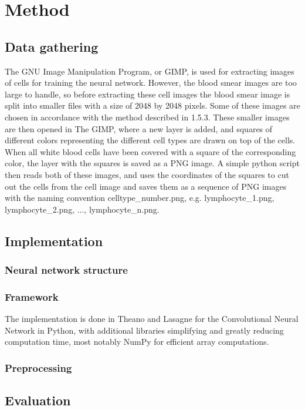 \chapter{Method}\label{cha:intro}

\section{Data gathering}\label{sec:research:history}
The GNU Image Manipulation Program, or GIMP, is used for extracting images of cells for training the neural network. However, the blood smear images are too large to handle, so before extracting these cell images the blood smear image is split into smaller files with a size of 2048 by 2048 pixels. Some of these images are chosen in accordance with the method described in 1.5.3. These smaller images are then opened in The GIMP, where a new layer is added, and squares of different colors representing the different cell types are drawn on top of the cells. When all white blood cells have been covered with a square of the corresponding color, the layer with the squares is saved as a PNG image. A simple python script then reads both of these images, and uses the coordinates of the squares to cut out the cells from the cell image and saves them as a sequence of PNG images with the naming convention celltype\_number.png, e.g. lymphocyte\_1.png, lymphocyte\_2.png, ..., lymphocyte\_n.png.

\section{Implementation}\label{sec:research:history}

\subsection{Neural network structure}\label{sec:research:history}


\subsection{Framework}\label{sec:research:history}
The implementation is done in Theano and Lasagne for the Convolutional Neural Network in Python, with additional libraries simplifying and greatly reducing computation time, most notably NumPy for efficient array computations. 

\subsection{Preprocessing}\label{sec:research:history}

\section{Evaluation}\label{sec:research:history}
